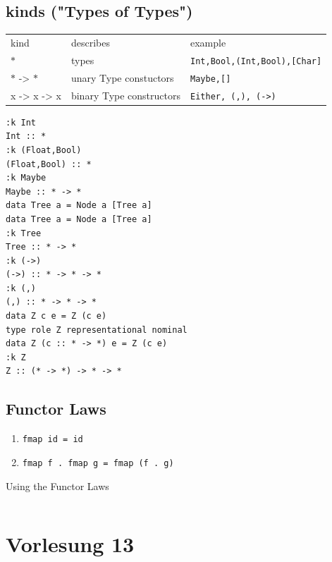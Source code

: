 \documentclass{article}
\newcommand{\Haskell}[1]{\texttt{#1}}
\begin{document}
\subsection{kinds ("Types of Types")}
\begin{tabular}{l|l|l}
kind&describes&example\\
$\ast$&types&\Haskell{Int,Bool,(Int,Bool),[Char]}\\
$\ast$ -> $\ast$&unary Type constuctors&\Haskell{Maybe,[]}\\
x -> x -> x&binary Type constructors&\Haskell{Either, (,), (->)}
\end{tabular}
\begin{verbatim}
:k Int
Int :: *
:k (Float,Bool)
(Float,Bool) :: *
:k Maybe
Maybe :: * -> *
data Tree a = Node a [Tree a]
data Tree a = Node a [Tree a]
:k Tree
Tree :: * -> *
:k (->)
(->) :: * -> * -> *
:k (,)
(,) :: * -> * -> *
data Z c e = Z (c e)
type role Z representational nominal
data Z (c :: * -> *) e = Z (c e)
:k Z
Z :: (* -> *) -> * -> *
\end{verbatim}
\subsection{Functor Laws}
\begin{enumerate}[1.]
\item \Haskell{fmap id = id}
\item \Haskell{fmap f . fmap g = fmap (f . g)}
\end{enumerate}
\begin{listing}
\caption{Using the Functor Laws}
\inputminted{Haskell}{Pred.hs}
\end{listing}
\clearpage
\section{Vorlesung 13}
\end{document}
